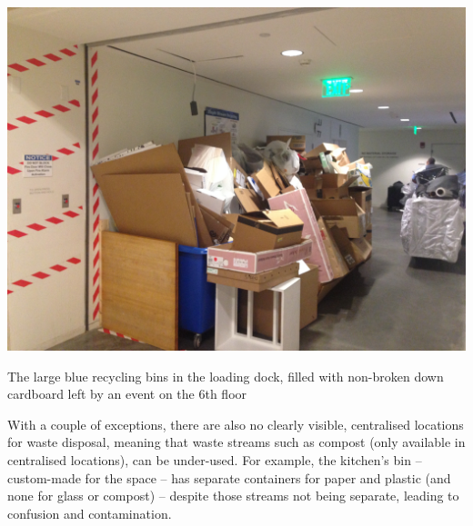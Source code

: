 \documentclass[nofonts,nols,justified,nobib]{tufte-book}
\begin{document}
\begin{marginfigure}
  \includegraphics[width=1\linewidth]{img/2/mit-bins/loading7.jpg}
  \caption{The large blue recycling bins in the loading dock, filled with non-broken down cardboard left by an event on the 6th floor}
\end{marginfigure}

With a couple of exceptions, there are also no clearly visible, centralised locations for waste disposal, meaning that waste streams such as compost (only available in centralised locations), can be under-used. For example, the kitchen's bin -- custom-made for the space -- has separate containers for paper and plastic (and none for glass or compost) -- despite those streams not being separate, leading to confusion and contamination.
\end{document}
